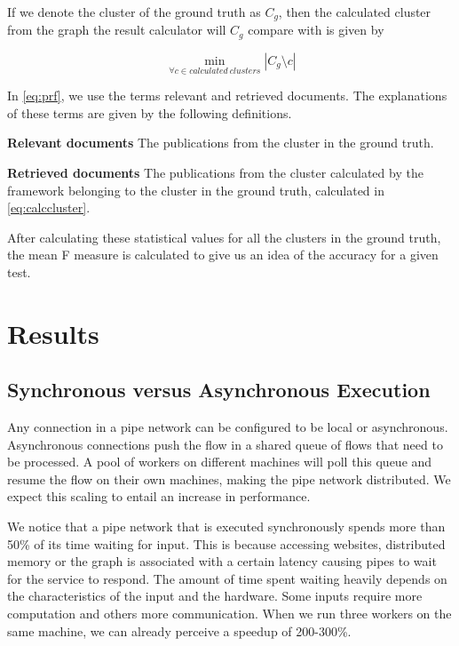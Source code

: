 If we denote the cluster of the ground truth as $C_g$, then the calculated cluster from the graph the result calculator will $C_g$ compare with is given by 

\begin{equation}
	\label{eq:calccluster}
	\min_{\forall c \in calculated~clusters}{\left| C_g \setminus c \right|}
\end{equation}

In \autoref{eq:prf}, we use the terms relevant and retrieved documents. The explanations of these terms are given by the following definitions.

\begin{mydef}
	\textbf{Relevant documents} The publications from the cluster in the ground truth.
\end{mydef}

\begin{mydef}
	\textbf{Retrieved documents} The publications from the cluster calculated by the framework belonging to the cluster in the ground truth, calculated in \autoref{eq:calccluster}.
\end{mydef}

After calculating these statistical values for all the clusters in the ground truth, the mean F measure is calculated to give us an idea of the accuracy for a given test.

\section{Results}

\subsection{Synchronous versus Asynchronous Execution}

Any connection in a pipe network can be configured to be local or asynchronous. Asynchronous connections push the flow in a shared queue of flows that need to be processed. A pool of workers on different machines will poll this queue and resume the flow on their own machines, making the pipe network distributed. We expect this scaling to entail an increase in performance.

We notice that a pipe network that is executed synchronously spends more than 50\% of its time waiting for input. This is because accessing websites, distributed memory or the graph is associated with a certain latency causing pipes to wait for the service to respond. The amount of time spent waiting heavily depends on the characteristics of the input and the hardware. Some inputs require more computation and others more communication. When we run three workers on the same machine, we can already perceive a speedup of 200-300\%.


